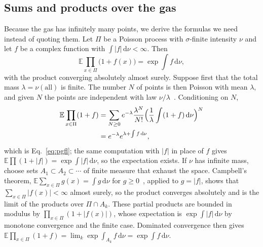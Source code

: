 \documentclass[aps,prd,10pt,twocolumn,superscriptaddress,nofootinbib,floatfix,longbibliography]{revtex4-2}
\newcommand{\bE}{\mathbb{E}}
\newcommand{\dd}{\mathrm{d}}
\begin{document}
\subsection{Sums and products over the gas}
\label{sec:avg}

Because the gas has infinitely many points, we derive the formulas we need instead of quoting them. Let $\Pi$ be a Poisson process with $\sigma$-finite intensity $\nu$ and let $f$ be a complex function with $\int|f|\,\dd\nu<\infty$. Then
\begin{equation}
\label{eq:pgfl}
\bE\prod_{x\in\Pi}\bigl(1+f(x)\bigr)=\exp\int f\,\dd\nu ,
\end{equation}
with the product converging absolutely almost surely. Suppose first that the total mass $\lambda=\nu(\text{all})$ is finite. The number $N$ of points is then Poisson with mean $\lambda$, and given $N$ the points are independent with law $\nu/\lambda$~\cite{LastPenrose2017}. Conditioning on $N$,
\begin{align*}
\bE\prod_{x\in\Pi}(1+f)&=\sum_{N\ge0}e^{-\lambda}\frac{\lambda^N}{N!}\Bigl(\frac1\lambda\int(1+f)\,\dd\nu\Bigr)^{N}\\
&=e^{-\lambda}e^{\lambda+\int f\,\dd\nu},
\end{align*}
which is Eq.~\eqref{eq:pgfl}; the same computation with $|f|$ in place of $f$ gives $\bE\prod(1+|f|)=\exp\int|f|\,\dd\nu$, so the expectation exists. If $\nu$ has infinite mass, choose sets $A_1\subset A_2\subset\cdots$ of finite measure that exhaust the space. Campbell's theorem, $\bE\sum_{x\in\Pi}g(x)=\int g\,\dd\nu$ for $g\ge0$~\cite{Kingman1993}, applied to $g=|f|$, shows that $\sum_{x\in\Pi}|f(x)|<\infty$ almost surely, so the product converges absolutely and is the limit of the products over $\Pi\cap A_k$. These partial products are bounded in modulus by $\prod_{x\in\Pi}(1+|f(x)|)$, whose expectation is $\exp\int|f|\,\dd\nu$ by monotone convergence and the finite case. Dominated convergence then gives $\bE\prod_{x\in\Pi}(1+f)=\lim_k\exp\int_{A_k}f\,\dd\nu=\exp\int f\,\dd\nu$.
\end{document}
